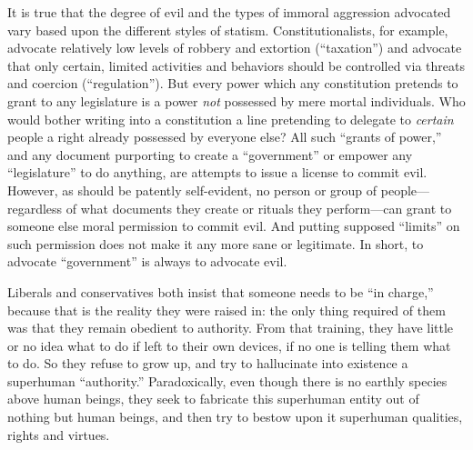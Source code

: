 \documentclass{book}
\begin{document}
It is true that the degree of evil and the types of immoral aggression advocated vary based upon the different styles of statism. Constitutionalists, for example, advocate relatively low levels of robbery and extortion (\enquote{taxation}) and advocate that only certain, limited activities and behaviors should be controlled via threats and coercion (\enquote{regulation}). But every power which any constitution pretends to grant to any legislature is a power \emph{not} possessed by mere mortal individuals. Who would bother writing into a constitution a line pretending to delegate to \emph{certain} people a right already possessed by everyone else? All such \enquote{grants of power,} and any document purporting to create a \enquote{government} or empower any \enquote{legislature} to do anything, are attempts to issue a license to commit evil. However, as should be patently self-evident, no person or group of people---regardless of what documents they create or rituals they perform---can grant to someone else moral permission to commit evil. And putting supposed \enquote{limits} on such permission does not make it any more sane or legitimate. In short, to advocate \enquote{government} is always to advocate evil.

Liberals and conservatives both insist that someone needs to be \enquote{in charge,} because that is the reality they were raised in: the only thing required of them was that they remain obedient to authority. From that training, they have little or no idea what to do if left to their own devices, if no one is telling them what to do. So they refuse to grow up, and try to hallucinate into existence a superhuman \enquote{authority.} Paradoxically, even though there is no earthly species above human beings, they seek to fabricate this superhuman entity out of nothing but human beings, and then try to bestow upon it superhuman qualities, rights and virtues.
\end{document}
